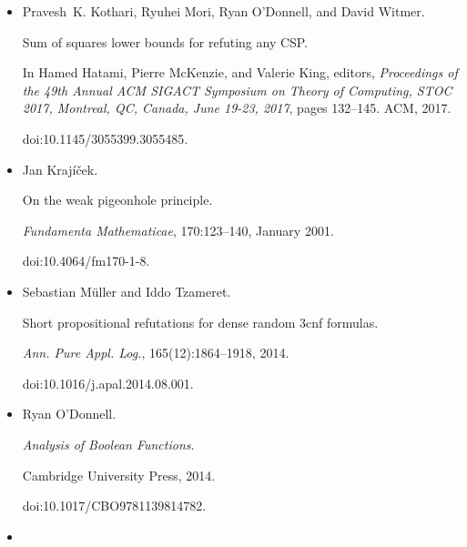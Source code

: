 \begin{itemize}
In Bojan Mohar, Igor Shinkar, and Ryan O’Donnell, editors, \emph{Proceedings of the 56th Annual ACM Symposium on Theory of Computing, STOC
2024, Vancouver, BC, Canada, June 24-28, 2024}, pages 776–787. ACM, 2024.


doi:10.1145/3618260.3649640.





\item[] 
[27]

Pravesh K. Kothari, Ryuhei Mori, Ryan O’Donnell, and David Witmer.


Sum of squares lower bounds for refuting any CSP.


In Hamed Hatami, Pierre McKenzie, and Valerie King, editors, \emph{Proceedings of the 49th Annual ACM SIGACT Symposium on Theory of
Computing, STOC 2017, Montreal, QC, Canada, June 19-23, 2017}, pages
132–145. ACM, 2017.


doi:10.1145/3055399.3055485.





\item[] 
[28]

Jan Krajíček.


On the weak pigeonhole principle.


\emph{Fundamenta Mathematicae}, 170:123–140, January 2001.


doi:10.4064/fm170-1-8.





\item[] 
[29]

Sebastian Müller and Iddo Tzameret.


Short propositional refutations for dense random 3cnf formulas.


\emph{Ann. Pure Appl. Log.}, 165(12):1864–1918, 2014.


doi:10.1016/j.apal.2014.08.001.





\item[] 
[30]

Ryan O’Donnell.


\emph{Analysis of Boolean Functions}.


Cambridge University Press, 2014.


doi:10.1017/CBO9781139814782.





\item[] 
[31]


\end{itemize}
